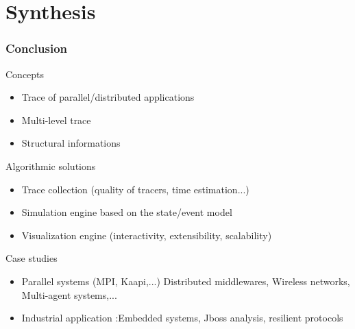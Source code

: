 \section{Synthesis}

\frame
{
  \frametitle{Conclusion}
  \begin{block}{Concepts}
  \begin{itemize}
  \item Trace of parallel/distributed applications
  \item Multi-level trace
  \item Structural informations
  \end{itemize}
    \end{block}
    \pause
  \begin{block}{Algorithmic solutions}
  \begin{itemize}
  \item Trace collection (quality of tracers, time estimation...)
  \item Simulation engine based on the state/event model
  \item Visualization  engine (interactivity, extensibility, scalability) 
  \end{itemize}
    \end{block}
    \pause
  \begin{block}{Case studies}
  \begin{itemize}
  \item Parallel systems (MPI, Kaapi,...) Distributed middlewares, Wireless networks, Multi-agent systems,...
  \item Industrial application :Embedded systems, Jboss analysis, resilient protocols 
  \end{itemize}
  \end{block}
}
